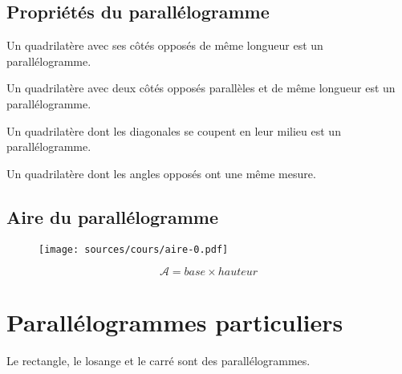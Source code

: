 \documentclass[paper=a4, fontsize=9pt]{scrartcl} %
\begin{document}
\subsection{Propriétés du parallélogramme}
\setlength{\columnseprule}{1pt}
\begin{multicols}{2}
  \begin{Proposition}
    Un quadrilatère avec ses côtés opposés de même longueur est un parallélogramme.
  \end{Proposition}

  \begin{Proposition}
    Un quadrilatère avec deux côtés opposés parallèles et de même longueur est un parallélogramme.
  \end{Proposition}

  \begin{Proposition}
    Un quadrilatère dont les diagonales se coupent en leur milieu est un parallélogramme.
  \end{Proposition}

  \begin{Proposition}
    Un quadrilatère dont les angles opposés ont une même mesure.
  \end{Proposition}
  \subsection{Aire du parallélogramme}

  \begin{figure}[H]
    \centering
    \texttt{[image: sources/cours/aire-0.pdf]}
  \end{figure}

  $$\mathcal{A} = base \times hauteur$$
\end{multicols}

\section{Parallélogrammes particuliers}

\begin{Proposition}
  Le rectangle, le losange et le carré sont des parallélogrammes.
\end{Proposition}
\end{document}
